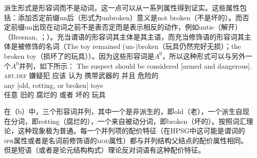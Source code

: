 \noindent
派生形式是形容词而不是动词，这一点可以从一系列属性得到证实。这些属性包括：添加否定前缀un后（形式为unbroken）意义是not broken（不是坏的）。而否定前缀un出现在动词之前不是表否定而是表示相反的动作，例如untie（解开）（Bresnan, \citeyear[]{Bresnan82a}；\citeyear[\S~3]{Bresnan2001a}）。充当谓语的形容词其主体是其主语，而充当修饰语的形容词其主体是被修饰的名词（The toy remained (un-)broken（玩具仍然完好无损）；the broken toy（损坏了的玩具））。因为这些形容词是$A^0$，所以这种形式可以与另外一个$A^0$并列，如下所示：
\eal
\ex 
\gll The suspect should be considered [armed and dangerous].\\
    \textsc{art}.\textsc{def} 嫌疑犯 应该 \passive{} 认为 携带武器的 并且 危险的\\
\ex 
\gll any [old, rotting, or broken] toys\\
    任意 \spacebr{}旧的 腐烂的 或者 坏的 玩具\\
\zl

\noindent
在（b）中，三个形容词并列，其中一个是非派生的，即old（老），一个派生自现在分词，即rotting（腐烂的），一个来自被动分词，即broken（坏的）。按照词汇理论，这种现象极为普通。每一个\azeroc 并列项的配价特征（在HPSG中这可能是谓词的\textsc{spr}属性或者是名词前修饰语的\textsc{mod}属性）都与并列结构父结点的配价属性相同。但是短语（或者是论元结构构式）理论反对词语有这种配价特征。



